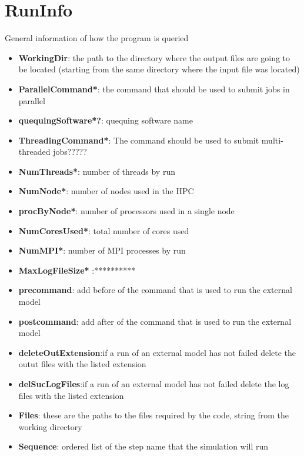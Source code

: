 \section{RunInfo  \\ \vspace{2 mm} {\small }}

General information of how the program is queried
\begin{itemize}

\item  \textbf{WorkingDir}: the path to the directory where the output files are going to be located (starting from the same directory where the input file was located)
\item \textbf{ParallelCommand*}: the command that should be used to submit jobs in parallel
\item \textbf{quequingSoftware*?}: quequing software name
\item \textbf{ThreadingCommand*}: The command should be used to submit multi-threaded jobs?????
\item \textbf{NumThreads*}: number of threads by run
\item \textbf{NumNode*}: number of nodes used in the HPC 
\item \textbf{procByNode*}: number of processors used in a single node 
\item \textbf{NumCoresUsed*}: total number of cores used
\item \textbf{NumMPI*}: number of MPI processes by run
\item \textbf{MaxLogFileSize*} :**********
\item \textbf{precommand}: add before of the command that is used to run the external model
\item \textbf{postcommand}: add after of the command that is used to run the external model
\item \textbf{deleteOutExtension}:if a run of an external model has not failed delete the outut files with the listed extension
\item \textbf{delSucLogFiles}:if a run of an external model has not failed delete the log files with the listed extension
\item \textbf{Files}: these are the paths to the files required by the code, string from the working directory 
\item \textbf{Sequence}: ordered list of the step name that the simulation will run

\end{itemize}
